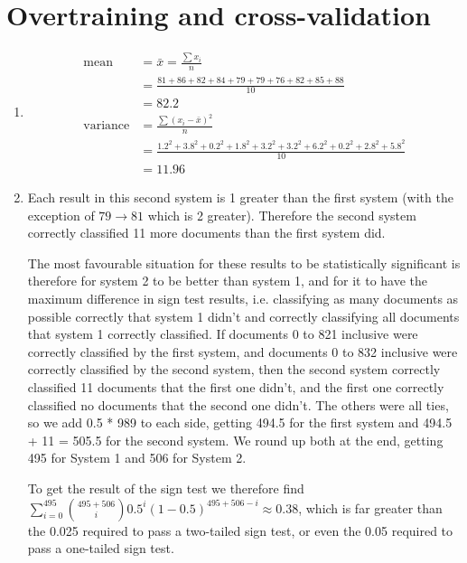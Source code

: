 \documentclass[12pt]{article}
\begin{document}
\section*{Overtraining and cross-validation}
\begin{enumerate}
    \item \begin{align*}
              \text{mean}     & = \bar{x} = \frac{\sum x_i}{n}                                                             \\
                              & = \frac{81+86+82+84+79+79+76+82+85+88}{10}                                                 \\
                              & = 82.2                                                                                     \\
              \text{variance} & = \frac{\sum (x_i - \bar{x})^2}{n}                                                         \\
                              & = \frac{1.2^2 + 3.8^2 + 0.2^2 + 1.8^2 + 3.2^2 + 3.2^2 + 6.2^2 + 0.2^2 + 2.8^2 + 5.8^2}{10} \\
                              & = 11.96
          \end{align*}
    \item Each result in this second system is 1 greater than the first system (with the exception of $79 \rightarrow 81$ which is 2 greater).
          Therefore the second system correctly classified 11 more documents than the first system did.

          The most favourable situation for these results to be statistically significant is therefore for system 2 to be better than system 1, and for it to have the maximum difference in sign test results, i.e. classifying as many documents as possible correctly that system 1 didn't and correctly classifying all documents that system 1 correctly classified.
          If documents 0 to 821 inclusive were correctly classified by the first system, and documents 0 to 832 inclusive were correctly classified by the second system, then the second system correctly classified 11 documents that the first one didn't, and the first one correctly classified no documents that the second one didn't.
          The others were all ties, so we add 0.5 * 989 to each side, getting 494.5 for the first system and 494.5 + 11 = 505.5 for the second system. We round up both at the end, getting 495 for System 1 and 506 for System 2.

          To get the result of the sign test we therefore find $\sum\limits_{i=0}^{495} {\binom{495 + 506}{i}} 0.5^i (1- 0.5)^{495 + 506 - i} \approx 0.38$, which is far greater than the 0.025 required to pass a two-tailed sign test, or even the 0.05 required to pass a one-tailed sign test.


\end{enumerate}
\end{document}
